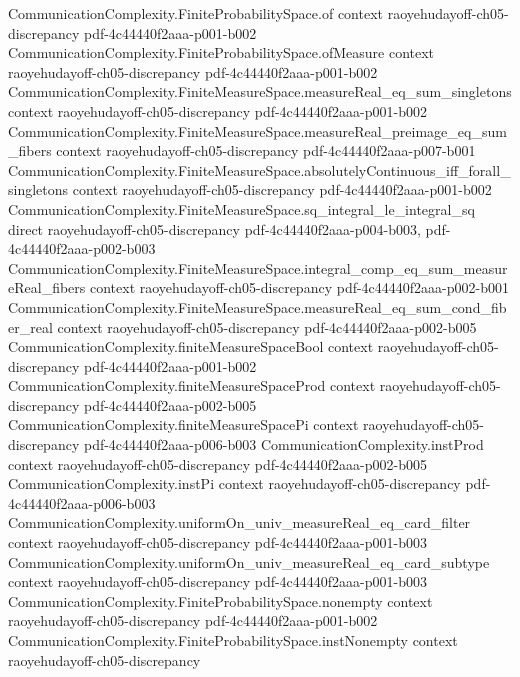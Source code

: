 \begin{theorem}
\proofstep
  {CommunicationComplexity.FiniteProbabilitySpace.of}
  {context}
  {raoyehudayoff-ch05-discrepancy}
  {pdf-4c44440f2aaa-p001-b002}
\proofstep
  {CommunicationComplexity.FiniteProbabilitySpace.ofMeasure}
  {context}
  {raoyehudayoff-ch05-discrepancy}
  {pdf-4c44440f2aaa-p001-b002}
\proofstep
  {CommunicationComplexity.FiniteMeasureSpace.measureReal_eq_sum_singletons}
  {context}
  {raoyehudayoff-ch05-discrepancy}
  {pdf-4c44440f2aaa-p001-b002}
\proofstep
  {CommunicationComplexity.FiniteMeasureSpace.measureReal_preimage_eq_sum_fibers}
  {context}
  {raoyehudayoff-ch05-discrepancy}
  {pdf-4c44440f2aaa-p007-b001}
\proofstep
  {CommunicationComplexity.FiniteMeasureSpace.absolutelyContinuous_iff_forall_singletons}
  {context}
  {raoyehudayoff-ch05-discrepancy}
  {pdf-4c44440f2aaa-p001-b002}
\proofstep
  {CommunicationComplexity.FiniteMeasureSpace.sq_integral_le_integral_sq}
  {direct}
  {raoyehudayoff-ch05-discrepancy}
  {pdf-4c44440f2aaa-p004-b003,
    pdf-4c44440f2aaa-p002-b003}
\proofstep
  {CommunicationComplexity.FiniteMeasureSpace.integral_comp_eq_sum_measureReal_fibers}
  {context}
  {raoyehudayoff-ch05-discrepancy}
  {pdf-4c44440f2aaa-p002-b001}
\proofstep
  {CommunicationComplexity.FiniteMeasureSpace.measureReal_eq_sum_cond_fiber_real}
  {context}
  {raoyehudayoff-ch05-discrepancy}
  {pdf-4c44440f2aaa-p002-b005}
\proofstep
  {CommunicationComplexity.finiteMeasureSpaceBool}
  {context}
  {raoyehudayoff-ch05-discrepancy}
  {pdf-4c44440f2aaa-p001-b002}
\proofstep
  {CommunicationComplexity.finiteMeasureSpaceProd}
  {context}
  {raoyehudayoff-ch05-discrepancy}
  {pdf-4c44440f2aaa-p002-b005}
\proofstep
  {CommunicationComplexity.finiteMeasureSpacePi}
  {context}
  {raoyehudayoff-ch05-discrepancy}
  {pdf-4c44440f2aaa-p006-b003}
\proofstep
  {CommunicationComplexity.instProd}
  {context}
  {raoyehudayoff-ch05-discrepancy}
  {pdf-4c44440f2aaa-p002-b005}
\proofstep
  {CommunicationComplexity.instPi}
  {context}
  {raoyehudayoff-ch05-discrepancy}
  {pdf-4c44440f2aaa-p006-b003}
\proofstep
  {CommunicationComplexity.uniformOn_univ_measureReal_eq_card_filter}
  {context}
  {raoyehudayoff-ch05-discrepancy}
  {pdf-4c44440f2aaa-p001-b003}
\proofstep
  {CommunicationComplexity.uniformOn_univ_measureReal_eq_card_subtype}
  {context}
  {raoyehudayoff-ch05-discrepancy}
  {pdf-4c44440f2aaa-p001-b003}
\proofstep
  {CommunicationComplexity.FiniteProbabilitySpace.nonempty}
  {context}
  {raoyehudayoff-ch05-discrepancy}
  {pdf-4c44440f2aaa-p001-b002}
\proofstep
  {CommunicationComplexity.FiniteProbabilitySpace.instNonempty}
  {context}
  {raoyehudayoff-ch05-discrepancy}

\end{theorem}
